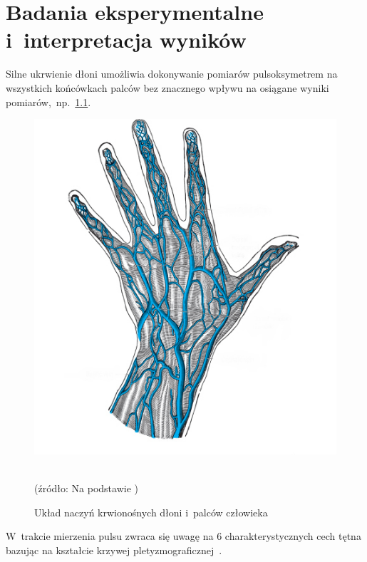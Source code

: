 \renewcommand{\figurename}{Rys.}

\chapter{Badania eksperymentalne i~interpretacja wyników}
\label{cha:test}

\fontsize{14}{15}\selectfont

Silne ukrwienie dłoni umożliwia dokonywanie pomiarów pulsoksymetrem na wszystkich końcówkach palców bez znacznego wpływu na osiągane wyniki 
pomiarów,~np.~\ref{rys:Dlon}.
\begin{figure}[!ht]
	\centerline{\includegraphics[scale = 0.56]{graphic/Dlon}}
	\caption{Układ naczyń krwionośnych dłoni i~palców człowieka}
	\label{rys:Dlon}
	~\\	
	(źródło: Na podstawie \cite{SzGa11})
\end{figure}

W~trakcie mierzenia pulsu zwraca się uwagę na 6 charakterystycznych cech tętna bazując na kształcie krzywej pletyzmograficznej~\cite{SzGa11}.

